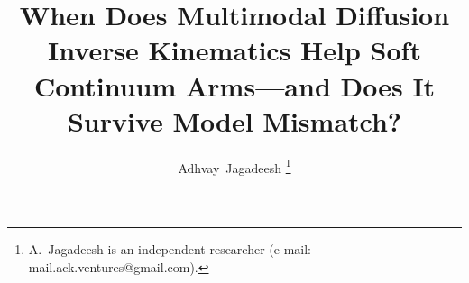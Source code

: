 \documentclass[journal]{IEEEtran}
\begin{document}
\title{When Does Multimodal Diffusion Inverse Kinematics Help Soft Continuum
Arms---and Does It Survive Model Mismatch?}

\author{Adhvay~Jagadeesh%
\thanks{A.~Jagadeesh is an independent researcher
(e-mail: mail.ack.ventures@gmail.com).}}

\maketitle





\end{document}
